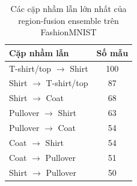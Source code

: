 \begin{table}[H]
\centering
\caption{Các cặp nhầm lẫn lớn nhất của region-fusion ensemble trên FashionMNIST}
\label{tab:fashion-mnist-region-fusion-top-errors}
\begin{tabular}{l c}
\toprule
Cặp nhầm lẫn & Số mẫu \\
\midrule
T-shirt/top $\rightarrow$ Shirt & 100 \\
Shirt $\rightarrow$ T-shirt/top & 87 \\
Shirt $\rightarrow$ Coat & 68 \\
Pullover $\rightarrow$ Shirt & 63 \\
Pullover $\rightarrow$ Coat & 54 \\
Coat $\rightarrow$ Shirt & 54 \\
Coat $\rightarrow$ Pullover & 51 \\
Shirt $\rightarrow$ Pullover & 50 \\
\bottomrule
\end{tabular}
\end{table}
